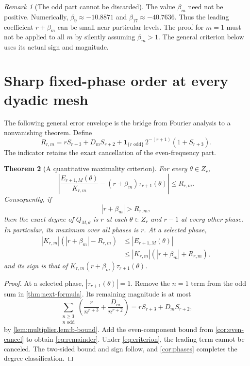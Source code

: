 \documentclass[11pt,a4paper]{article}
\numberwithin{equation}{section}
\theoremstyle{plain}
\newtheorem{theorem}{Theorem}[section]
\theoremstyle{definition}
\theoremstyle{remark}
\newtheorem{remark}[theorem]{Remark}
\newcommand{\abs}[1]{\left|#1\right|}
\begin{document}
\begin{remark}[The odd part cannot be discarded]
The value $\beta_m$ need not be positive. Numerically,
$\beta_9\approx-10.8871$ and $\beta_{17}\approx-40.7636$.
Thus the leading coefficient $r+\beta_m$ can be small near particular
levels. The proof for $m=1$ must not be applied to all $m$ by silently
assuming $\beta_m>1$. The general criterion below uses its actual sign
and magnitude.
\end{remark}

\section{Sharp fixed-phase order at every dyadic mesh}
\label{sec:dyadic}

The following general error envelope is the bridge from Fourier analysis
to a nonvanishing theorem. Define
\begin{equation}\label{eq:R}
 R_{r,m}=rS_{r+3}+D_mS_{r+2}
 +\mathbf1_{\{r\text{ odd}\}}\,2^{-(r+1)}(1+S_{r+3}).
\end{equation}
The indicator retains the exact cancellation of the even-frequency part.

\begin{theorem}[A quantitative maximality criterion]
\label{thm:criterion}
For every $\theta\in Z_r$,
\begin{equation}\label{eq:remainder}
 \abs{\frac{E_{r+1,M}(\theta)}{K_{r,m}}
 -(r+\beta_m)\tau_{r+1}(\theta)}\le R_{r,m}.
\end{equation}
Consequently, if
\begin{equation}\label{eq:criterion}
 |r+\beta_m|>R_{r,m},
\end{equation}
then the exact degree of $Q_{M,\theta}$ is $r$ at each $\theta\in Z_r$
and $r-1$ at every other phase. In particular, its maximum over all phases
is $r$. At a selected phase,
\begin{align}
 |K_{r,m}|(|r+\beta_m|-R_{r,m})
 &\le |E_{r+1,M}(\theta)|\nonumber\\
 &\le |K_{r,m}|(|r+\beta_m|+R_{r,m}),\label{eq:two-sided}
\end{align}
and its sign is that of
$K_{r,m}(r+\beta_m)\tau_{r+1}(\theta)$.
\end{theorem}
\begin{proof}
At a selected phase, $|\tau_{r+1}(\theta)|=1$. Remove the $n=1$ term
from the odd sum in \cref{thm:next-formula}. Its remaining magnitude is
at most
\[
 \sum_{\substack{n\ge3\\n\text{ odd}}}
 \left(\frac{r}{n^{r+3}}+\frac{D_m}{n^{r+2}}\right)
 =rS_{r+3}+D_mS_{r+2},
\]
by \cref{lem:multiplier,lem:b-bound}. Add the even-component bound from
\cref{cor:even-cancel} to obtain \eqref{eq:remainder}. Under
\eqref{eq:criterion}, the leading term cannot be canceled. The two-sided
bound and sign follow, and \cref{cor:phases} completes the degree
classification.
\end{proof}
\end{document}
